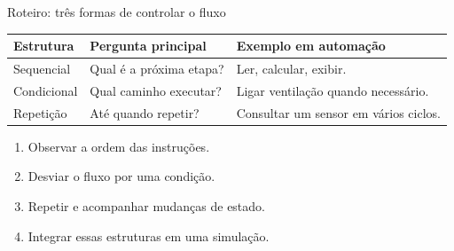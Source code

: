 \begin{frame}{Roteiro: três formas de controlar o fluxo}
\begin{tabularx}{\textwidth}{lXX}
\toprule
Estrutura & Pergunta principal & Exemplo em automação \\
\midrule
Sequencial & Qual é a próxima etapa? & Ler, calcular, exibir. \\
Condicional & Qual caminho executar? & Ligar ventilação quando necessário. \\
Repetição & Até quando repetir? & Consultar um sensor em vários ciclos. \\
\bottomrule
\end{tabularx}
\vspace{0.4cm}
\begin{enumerate}
\item Observar a ordem das instruções.
\item Desviar o fluxo por uma condição.
\item Repetir e acompanhar mudanças de estado.
\item Integrar essas estruturas em uma simulação.
\end{enumerate}
\end{frame}
